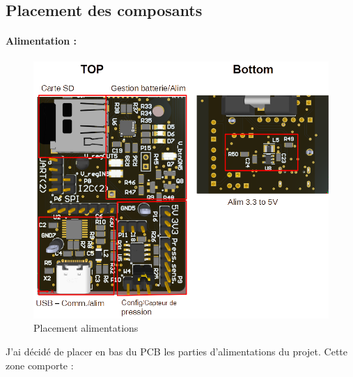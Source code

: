 \subsection{Placement des composants} \label{ssec:placementComp}
{
\paragraph{Alimentation :}
\begin{figure}[h]
	\centering
	\includegraphics[width=0.9\linewidth]{Figures/BasPCB}
	\caption{Placement alimentations}
	\label{fig:baspcb}
\end{figure}

J'ai décidé de placer en bas du PCB les parties d'alimentations du projet. Cette zone comporte :

}
